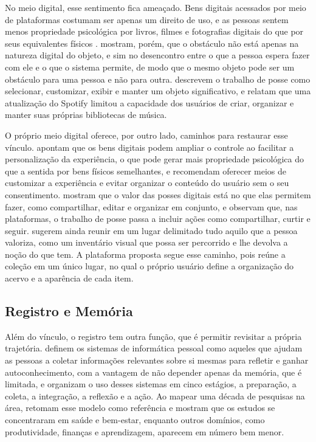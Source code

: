 No meio digital, esse sentimento fica ameaçado. Bens digitais acessados por meio de plataformas costumam ser apenas um direito de uso, e as pessoas sentem menos
propriedade psicológica por livros, filmes e fotografias digitais do que por seus equivalentes físicos \cite{Morewedge2021}. 
mostram, porém, que o obstáculo não está apenas na natureza digital do objeto, e sim no desencontro entre o que a pessoa espera fazer com ele e o que o sistema
permite, de modo que o mesmo objeto pode ser um obstáculo para uma pessoa e não para outra.  descrevem o trabalho de posse
como selecionar, customizar, exibir e manter um objeto significativo, e relatam que uma atualização do Spotify limitou a capacidade dos usuários de criar,
organizar e manter suas próprias bibliotecas de música.

O próprio meio digital oferece, por outro lado, caminhos para restaurar esse vínculo.  apontam que os bens digitais podem ampliar
o controle ao facilitar a personalização da experiência, o que pode gerar mais propriedade psicológica do que a sentida por bens físicos semelhantes, e
recomendam oferecer meios de customizar a experiência e evitar organizar o conteúdo do usuário sem o seu consentimento.  mostram que
o valor das posses digitais está no que elas permitem fazer, como compartilhar, editar e organizar em conjunto, e  observam
que, nas plataformas, o trabalho de posse passa a incluir ações como compartilhar, curtir e seguir.  sugerem ainda reunir em
um lugar delimitado tudo aquilo que a pessoa valoriza, como um inventário visual que possa ser percorrido e lhe devolva a noção do que tem. A plataforma
proposta segue esse caminho, pois reúne a coleção em um único lugar, no qual o próprio usuário define a organização do acervo e a aparência de cada item.

\subsection{Registro e Memória}
\label{subsec:registro-memoria}

Além do vínculo, o registro tem outra função, que é permitir revisitar a própria trajetória.  definem os sistemas de informática
pessoal como aqueles que ajudam as pessoas a coletar informações relevantes sobre si mesmas para refletir e ganhar autoconhecimento, com a vantagem de não
depender apenas da memória, que é limitada, e organizam o uso desses sistemas em cinco estágios, a preparação, a coleta, a integração, a reflexão e a ação.
Ao mapear uma década de pesquisas na área,  retomam esse modelo como referência e mostram que os
estudos se concentraram em saúde e bem-estar, enquanto outros domínios, como produtividade, finanças e aprendizagem, aparecem em número bem menor.

